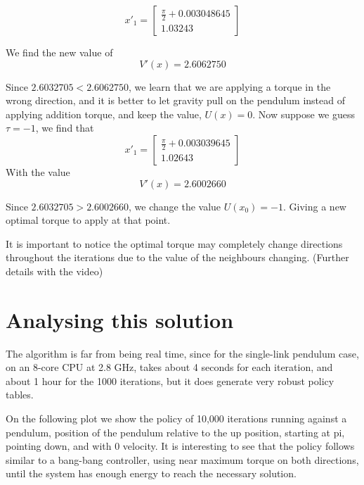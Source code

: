 \documentclass[12pt]{report}
\begin{document}
\begin{equation} 
{x'}_1 = 
\begin{bmatrix}
\frac{\pi}{2} + 0.003048645 \\
1.03243
\end{bmatrix}
\end{equation}

We find the new value of
\begin{equation} 
V'(x) = 2.6062750
\end{equation}

Since $2.6032705 < 2.6062750$, we learn that we are applying a torque in the wrong direction, and it is better to let gravity pull on the pendulum instead of applying addition torque, and keep the value, $U(x)={0}$. Now suppose we guess $\tau = -1$, we find that 
\begin{equation} 
{x'}_1 = 
\begin{bmatrix}
\frac{\pi}{2} + 0.003039645 \\
1.02643
\end{bmatrix}
\end{equation}
With the value
\begin{equation} 
V'(x) = 2.6002660
\end{equation}

Since $2.6032705 > 2.6002660$, we change the value $U(x_0)={-1}$. Giving a new optimal torque to apply at that point.

It is important to notice the optimal torque may completely change directions throughout the iterations due to the value of the neighbours changing. (Further details with the video)

\section{Analysing this solution}
The algorithm is far from being real time, since for the single-link pendulum case, on an 8-core CPU at 2.8 GHz, takes about 4 seconds for each iteration, and about 1 hour for the 1000 iterations, but it does generate very robust policy tables.

On the following plot we show the policy of 10,000 iterations running against a pendulum, position of the pendulum relative to the up position, starting at pi, pointing down, and with 0 velocity. It is interesting to see that the policy follows similar to a bang-bang controller, using near maximum torque on both directions, until the system has enough energy to reach the necessary solution. 
\end{document}
